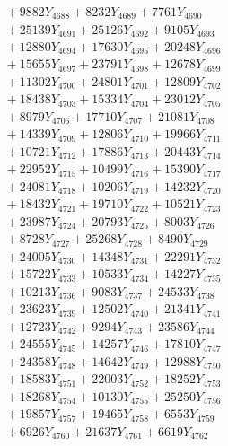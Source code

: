 \documentclass[a4paper,10pt]{article}
\begin{document}
{\begin{align}
&\;  + 9882 Y_{4688} + 8232 Y_{4689} + 7761 Y_{4690} \\[0.3ex]
&\;  + 25139 Y_{4691} + 25126 Y_{4692} + 9105 Y_{4693} \\[0.3ex]
&\;  + 12880 Y_{4694} + 17630 Y_{4695} + 20248 Y_{4696} \\[0.3ex]
&\;  + 15655 Y_{4697} + 23791 Y_{4698} + 12678 Y_{4699} \\[0.3ex]
&\;  + 11302 Y_{4700} + 24801 Y_{4701} + 12809 Y_{4702} \\[0.3ex]
&\;  + 18438 Y_{4703} + 15334 Y_{4704} + 23012 Y_{4705} \\[0.3ex]
&\;  + 8979 Y_{4706} + 17710 Y_{4707} + 21081 Y_{4708} \\[0.5ex]\allowbreak
&\;  + 14339 Y_{4709} + 12806 Y_{4710} + 19966 Y_{4711} \\[0.3ex]
&\;  + 10721 Y_{4712} + 17886 Y_{4713} + 20443 Y_{4714} \\[0.3ex]
&\;  + 22952 Y_{4715} + 10499 Y_{4716} + 15390 Y_{4717} \\[0.3ex]
&\;  + 24081 Y_{4718} + 10206 Y_{4719} + 14232 Y_{4720} \\[0.3ex]
&\;  + 18432 Y_{4721} + 19710 Y_{4722} + 10521 Y_{4723} \\[0.3ex]
&\;  + 23987 Y_{4724} + 20793 Y_{4725} + 8003 Y_{4726} \\[0.3ex]
&\;  + 8728 Y_{4727} + 25268 Y_{4728} + 8490 Y_{4729} \\[0.3ex]
&\;  + 24005 Y_{4730} + 14348 Y_{4731} + 22291 Y_{4732} \\[0.3ex]
&\;  + 15722 Y_{4733} + 10533 Y_{4734} + 14227 Y_{4735} \\[0.3ex]
&\;  + 10213 Y_{4736} + 9083 Y_{4737} + 24533 Y_{4738} \\[0.5ex]\allowbreak
&\;  + 23623 Y_{4739} + 12502 Y_{4740} + 21341 Y_{4741} \\[0.3ex]
&\;  + 12723 Y_{4742} + 9294 Y_{4743} + 23586 Y_{4744} \\[0.3ex]
&\;  + 24555 Y_{4745} + 14257 Y_{4746} + 17810 Y_{4747} \\[0.3ex]
&\;  + 24358 Y_{4748} + 14642 Y_{4749} + 12988 Y_{4750} \\[0.3ex]
&\;  + 18583 Y_{4751} + 22003 Y_{4752} + 18252 Y_{4753} \\[0.3ex]
&\;  + 18268 Y_{4754} + 10130 Y_{4755} + 25250 Y_{4756} \\[0.3ex]
&\;  + 19857 Y_{4757} + 19465 Y_{4758} + 6553 Y_{4759} \\[0.3ex]
&\;  + 6926 Y_{4760} + 21637 Y_{4761} + 6619 Y_{4762} \\[0.3ex]

\end{align}}
\end{document}
